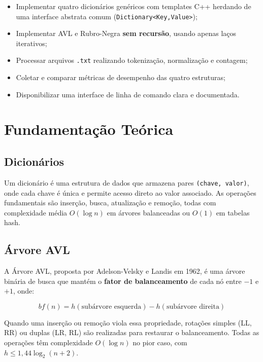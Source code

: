 \documentclass[12pt, a4paper]{article}
\begin{document}
\begin{itemize}
    \item Implementar quatro dicionários genéricos com templates C++ herdando de uma
          interface abstrata comum (\texttt{Dictionary<Key,Value>});
    \item Implementar AVL e Rubro-Negra \textbf{sem recursão}, usando apenas laços iterativos;
    \item Processar arquivos \texttt{.txt} realizando tokenização, normalização e contagem;
    \item Coletar e comparar métricas de desempenho das quatro estruturas;
    \item Disponibilizar uma interface de linha de comando clara e documentada.
\end{itemize}

\section{Fundamentação Teórica}

\subsection{Dicionários}

Um dicionário é uma estrutura de dados que armazena pares \texttt{(chave, valor)}, onde
cada chave é única e permite acesso direto ao valor associado. As operações fundamentais
são inserção, busca, atualização e remoção, todas com complexidade média $O(\log n)$ em
árvores balanceadas ou $O(1)$ em tabelas hash.

\subsection{Árvore AVL}

A Árvore AVL, proposta por Adelson-Velsky e Landis em 1962, é uma árvore binária de
busca que mantém o \textbf{fator de balanceamento} de cada nó entre $-1$ e $+1$, onde:

\begin{equation}
    bf(n) = h(\text{subárvore esquerda}) - h(\text{subárvore direita})
\end{equation}

Quando uma inserção ou remoção viola essa propriedade, rotações simples (LL, RR) ou
duplas (LR, RL) são realizadas para restaurar o balanceamento. Todas as operações têm
complexidade $O(\log n)$ no pior caso, com $h \leq 1{,}44 \log_2(n+2)$.
\end{document}
